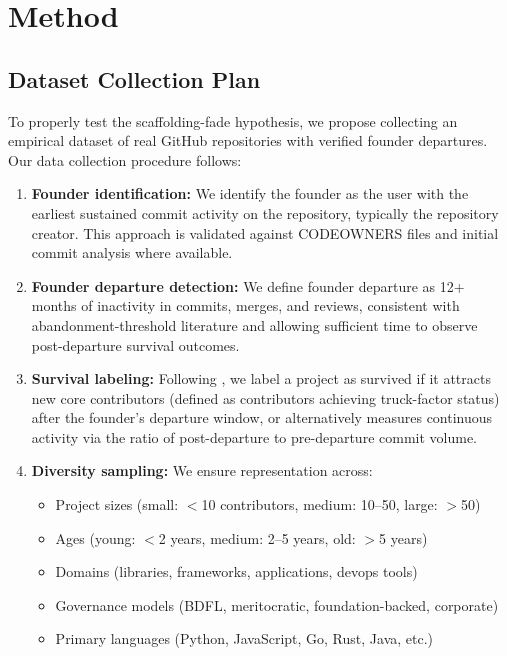 \documentclass[11pt,letterpaper]{article}
\begin{document}
\section{Method}
\label{sec:method}

\subsection{Dataset Collection Plan}

To properly test the scaffolding-fade hypothesis, we propose collecting an empirical dataset of real GitHub repositories with verified founder departures. Our data collection procedure follows:

\begin{enumerate}
  \item \textbf{Founder identification:} We identify the founder as the user with the earliest sustained commit activity on the repository, typically the repository creator. This approach is validated against CODEOWNERS files and initial commit analysis where available.
  \item \textbf{Founder departure detection:} We define founder departure as 12+ months of inactivity in commits, merges, and reviews, consistent with abandonment-threshold literature \citep{Avelino2019} and allowing sufficient time to observe post-departure survival outcomes.
  \item \textbf{Survival labeling:} Following \citet{Avelino2019}, we label a project as survived if it attracts new core contributors (defined as contributors achieving truck-factor status) after the founder's departure window, or alternatively measures continuous activity via the ratio of post-departure to pre-departure commit volume.
  \item \textbf{Diversity sampling:} We ensure representation across:
  \begin{itemize}
    \item Project sizes (small: $<$10 contributors, medium: 10--50, large: $>$50)
    \item Ages (young: $<$2 years, medium: 2--5 years, old: $>$5 years)
    \item Domains (libraries, frameworks, applications, devops tools)
    \item Governance models (BDFL, meritocratic, foundation-backed, corporate)
    \item Primary languages (Python, JavaScript, Go, Rust, Java, etc.)
  \end{itemize}
\end{enumerate}
\end{document}
